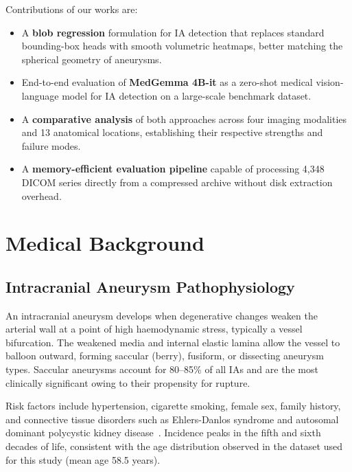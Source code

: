 \documentclass[journal]{IEEEtran}
\begin{document}
Contributions of our works are:
\begin{itemize}
  \item A \textbf{blob regression} formulation for IA detection that replaces
        standard bounding-box heads with smooth volumetric heatmaps, better
        matching the spherical geometry of aneurysms.
  \item End-to-end evaluation of \textbf{MedGemma 4B-it} as a zero-shot
        medical vision-language model for IA detection on a large-scale
        benchmark dataset.
  \item A \textbf{comparative analysis} of both approaches across four imaging
        modalities and 13 anatomical locations, establishing their respective
        strengths and failure modes.
  \item A \textbf{memory-efficient evaluation pipeline} capable of processing
        4,348 DICOM series directly from a compressed archive without disk
        extraction overhead.
\end{itemize}

\section{Medical Background}
\label{sec:medical}

\subsection{Intracranial Aneurysm Pathophysiology}

An intracranial aneurysm develops when degenerative changes weaken the arterial
wall at a point of high haemodynamic stress, typically a vessel bifurcation.
The weakened media and internal elastic lamina allow the vessel to balloon
outward, forming saccular (berry), fusiform, or dissecting aneurysm types.
Saccular aneurysms account for 80--85\% of all IAs and are the most clinically
significant owing to their propensity for rupture.

Risk factors include hypertension, cigarette smoking, female sex, family history,
and connective tissue disorders such as Ehlers-Danlos syndrome and autosomal
dominant polycystic kidney disease~\cite{rinkel1998prevalence}. Incidence peaks
in the fifth and sixth decades of life, consistent with the age distribution
observed in the dataset used for this study (mean age 58.5 years).
\end{document}
